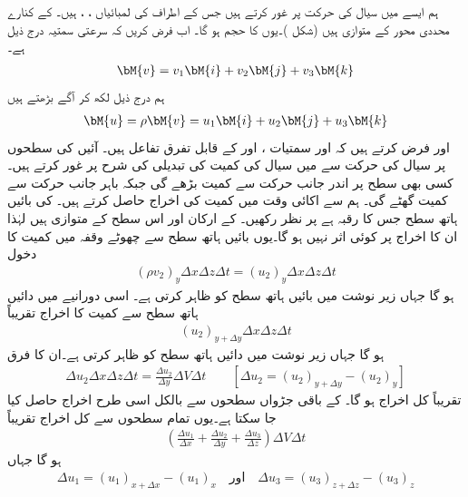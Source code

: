 ہم ایسے   میں سیال کی حرکت پر غور کرتے ہیں جس کے اطراف کی لمبائیاں ، ،  ہیں۔ کے کنارے محددی محور کے متوازی ہیں (شکل )۔یوں  کا حجم  ہو گا۔ اب فرض کریں کہ  سرعتی   سمتیہ درج ذیل ہے۔
\begin{align}
\bM{v}=v_1\bM{i}+v_2\bM{j}+v_3\bM{k}
\end{align}
ہم درج ذیل لکھ کر آگے بڑھتے ہیں
\begin{align}
\bM{u}=\rho \bM{v}=u_1\bM{i}+u_2\bM{j}+u_3\bM{k}
\end{align}
 اور فرض کرتے ہیں کہ  اور  سمتیات ،  اور  کے قابل تفرق تفاعل ہیں۔ آئیں  کی سطحوں پر سیال کی حرکت سے  میں سیال  کی کمیت کی تبدیلی کی شرح  پر غور کرتے ہیں۔کسی بھی سطح پر اندر جانب حرکت سے کمیت بڑھے گی جبکہ باہر جانب حرکت سے کمیت گھٹے گی۔ ہم  سے اکائی وقت میں کمیت کی اخراج حاصل کرتے ہیں۔ کی بائیں ہاتھ سطح جس کا رقبہ  ہے پر نظر رکھیں۔ کے ارکان  اور  اس سطح کے متوازی ہیں لہٰذا ان کا اخراج پر کوئی اثر نہیں ہو گا۔یوں بائیں ہاتھ سطح سے چھوٹے وقفہ  میں کمیت کا دخول 
\begin{align*}
(\rho v_2)_y\Delta x \Delta z \Delta t=(u_2)_y\Delta x\Delta z\Delta t
\end{align*}
ہو گا جہاں زیر نوشت میں  بائیں ہاتھ سطح کو ظاہر کرتی ہے۔ اسی دورانیے میں دائیں ہاتھ سطح سے کمیت کا اخراج تقریباً
\begin{align*}
(u_2)_{y+\Delta y}\Delta x\Delta z\Delta t
\end{align*}
ہو گا جہاں زیر نوشت میں  دائیں ہاتھ سطح کو ظاہر کرتی ہے۔ان کا فرق
\begin{align*}
\Delta u_2 \Delta x\Delta z\Delta t=\frac{\Delta u_2}{\Delta y}\Delta V\Delta t\quad \quad [\Delta u_2=(u_2)_{y+\Delta y}-(u_2)_y]
\end{align*}
تقریباً  کل اخراج ہو گا۔ کے باقی جڑواں سطحوں سے بالکل اسی طرح اخراج حاصل کیا جا سکتا ہے۔یوں تمام سطحوں سے کل اخراج تقریباً
\begin{align}\label{مساوات_الاحصاء_اخراج_الف}
\left(\frac{\Delta u_1}{\Delta x}+\frac{\Delta u_2}{\Delta y}+\frac{\Delta u_3}{\Delta z}\right)\Delta V\Delta t
\end{align}
ہو گا جہاں
\begin{align*}
\Delta u_1=(u_1)_{x+\Delta x}-(u_1)_x \quad \text{اور}\quad \Delta u_3=(u_3)_{z+\Delta z}-(u_3)_z
\end{align*}
